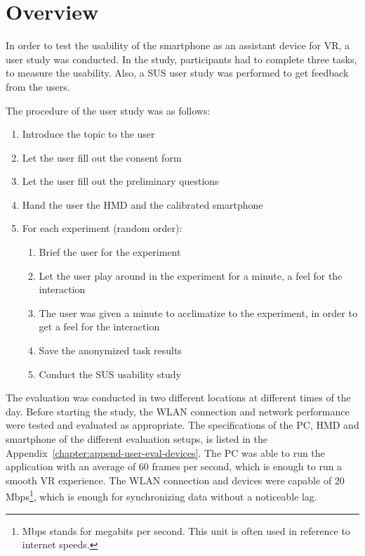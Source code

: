 \section{Overview}\label{section:evaluation-overview}
In order to test the usability of the smartphone as an assistant device for \gls{VR}, a user study was conducted. In the study, participants had to complete three tasks, to measure the usability. Also, a \gls{SUS} user study was performed to get feedback from the users.

The procedure of the user study was as follows:
\begin{enumerate}
  \item Introduce the topic to the user
  \item Let the user fill out the consent form
  \item Let the user fill out the preliminary questions
  \item Hand the user the \gls{HMD} and the calibrated smartphone
  \item For each experiment (random order):
  \begin{enumerate}
    \item Brief the user for the experiment
    \item Let the user play around in the experiment for a minute, a feel for the interaction
    \item The user was given a minute to acclimatize to the experiment, in order to get a feel for the interaction
    \item Save the anonymized task results
    \item Conduct the \gls{SUS} usability study
  \end{enumerate}
\end{enumerate}

The evaluation was conducted in two different locations at different times of the day. Before starting the study, the \gls{WLAN} connection and network performance were tested and evaluated as appropriate. The specifications of the \gls{PC}, \gls{HMD} and smartphone of the different evaluation setups, is listed in the Appendix~\ref{chapter:append-user-eval-devices}. The \gls{PC} was able to run the application with an average of 60 frames per second, which is enough to run a smooth \gls{VR} experience. The \gls{WLAN} connection and devices were capable of 20 Mbps\footnote{Mbps stands for megabits per second. This unit is often used in reference to internet speeds.}, which is enough for synchronizing data without a noticeable lag.

